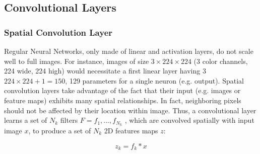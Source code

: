     \subsection{Convolutional Layers}
    \subsubsection{Spatial Convolution Layer}
    Regular Neural Networks, only made of linear and activation layers, do not scale well to full images. For instance, images of size $3 \times 224 \times 224$ (3 color channels, 224 wide, 224 high) would necessitate a first linear layer having 3  $224 \times 224 + 1 = 150$, 129 parameters for a single neuron (e.g. output). Spatial convolution layers take advantage of the fact that their input (e.g. images or feature maps) exhibits many spatial relationships. In
    fact, neighboring pixels should not be affected by their location within image. Thus, a
    convolutional layer learns a set of $N_k$ filters $F = f_1 , ..., f_{N_k}$ , which are convolved spatially
    with input image $x$, to produce a set of $N_k$ 2D features maps $z$:
    
    \begin{equation*}
        z_k=f_k * x
    \end{equation*}
    
